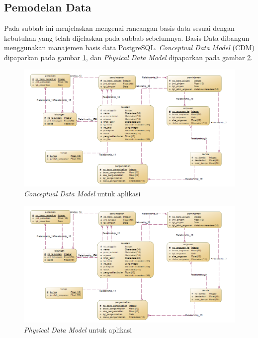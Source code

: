   \subsection{Pemodelan Data}
	\indent Pada subbab ini menjelaskan mengenai rancangan basis data sesuai dengan kebutuhan yang telah dijelaskan pada subbab sebelumnya. Basis Data dibangun menggunakan manajemen basis data PostgreSQL. \textit{Conceptual Data Model} (CDM) dipaparkan pada gambar \ref{cdm}, dan \textit{Physical Data Model} dipaparkan pada gambar \ref{pdm}.
      \begin{figure}[H]
        \centering
        \includegraphics[width=\linewidth]{images/bab3/cdm.png}
        \caption{\textit{Conceptual Data Model} untuk aplikasi}
        \label{cdm}
      \end{figure}
      \begin{figure}[H]
        \centering
        \includegraphics[width=\textwidth]{images/bab3/cdm.png}
        \caption{\textit{Physical Data Model} untuk aplikasi}
        \label{pdm}
      \end{figure}
      
